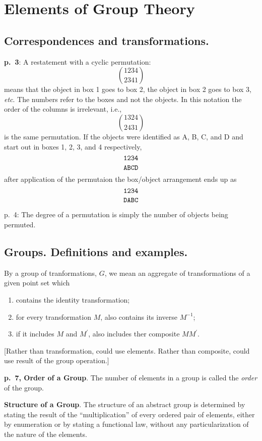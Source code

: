 \documentclass{book}
\begin{document}
\chapter{Elements of Group Theory}

\section{Correspondences and transformations.}

{\bf p.\ 3}: A restatement with a cyclic permutation:
$$
\genfrac(){0pt}0{1234}{2341}
$$
means that the object in box 1 goes to box 2, the object in box 2 goes
to box 3, {\it etc}. The numbers refer to the boxes and not the
objects. In this notation the order of the columns is irrelevant,
i.e.,
$$
\genfrac(){0pt}0{1324}{2431}
$$
is the same permutation.  If the objects were identified as A, B, C,
and D and start out in boxes 1, 2, 3, and 4 respectively,
$$
\genfrac{}{}{0pt}0{\tt 1234}{\tt ABCD}
$$
after application of the permutaion the box/object arrangement ends up as
$$
\genfrac{}{}{0pt}0{\tt 1234}{\tt DABC}
$$

p.\ 4: The degree of a permutation is simply the number of objects
being permuted.

\section{Groups. Definitions and examples.}

By a group of tranformations, $G$, we mean an aggregate of
transformations of a given point set which
\begin{enumerate}
\item contains the identity transformation;
\item for every transformation $M$, also contains its inverse $M^{-1}$;
\item if it includes $M$ and $M^\prime$, also includes ther composite $MM^\prime$.
\end{enumerate}

[Rather than transformation, could use elements. Rather than
  composite, could use result of the group operation.]

{\bf p.\ 7, Order of a Group}. The number of elements in a group is
called the {\it order} of the group.

{\bf Structure of a Group}. The structure of an abstract group is
determined by stating the result of the ``multiplication'' of every
ordered pair of elements, either by enumeration or by stating a
functional law, without any particularization of the nature of the
elements.
\end{document}
